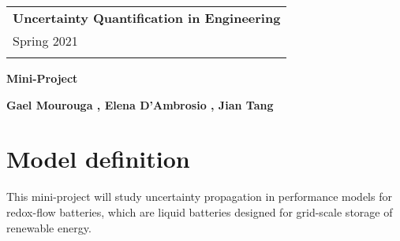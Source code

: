 \documentclass[a4paper,12pt]{article} %
\begin{document}



\thispagestyle{empty} %

\begin{tabular}{p{15.5cm}} %

{\large \bf Uncertainty Quantification in Engineering} \\
Spring 2021  \\
\hline %
\\
\end{tabular} %

\vspace*{0.3cm} %

\begin{center} %
	{\Large \bf Mini-Project} %
	\vspace{2mm}
	
	{\bf Gael Mourouga , Elena D'Ambrosio , Jian Tang } %
		
\end{center}  

\vspace{0.4cm}

\section{Model definition}
This mini-project will study uncertainty propagation in performance models for redox-flow batteries, which are liquid batteries designed for grid-scale storage of renewable energy.
\end{document}
